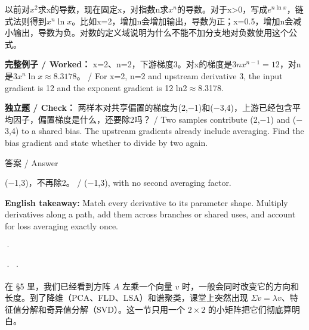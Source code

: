 

以前对\(x^2\)求x的导数，现在固定x，对指数n求\(x^n\)的导数。对于x>0，写成\(e^{n\ln x}\)，链式法则得到\(x^n\ln x\)。比如x=2，增加n会增加输出，导数为正；x=0.5，增加n会减小输出，导数为负。对数的定义域说明为什么不能不加分支地对负数使用这个公式。


\textbf{完整例子 / Worked：} x=2、n=2，下游梯度3。对x的梯度是\(3n x^{n-1}=12\)，对n是\(3x^n\ln x\approx8.3178\)。 / For x=2, n=2 and upstream derivative 3, the input gradient is 12 and the exponent gradient is 12 ln2\ensuremath{\approx}8.3178.


\textbf{独立题 / Check：} 两样本对共享偏置的梯度为(2,\ensuremath{-}1)和(\ensuremath{-}3,4)，上游已经包含平均因子，偏置梯度是什么，还要除2吗？ / Two samples contribute (2,\ensuremath{-}1) and (\ensuremath{-}3,4) to a shared bias. The upstream gradients already include averaging. Find the bias gradient and state whether to divide by two again.



\begin{StudySolution}{答案 / Answer}


(\ensuremath{-}1,3)，不再除2。 / (\ensuremath{-}1,3), with no second averaging factor.


\end{StudySolution}


\textbf{English takeaway:} Match every derivative to its parameter shape. Multiply derivatives along a path, add them across branches or shared uses, and account for loss averaging exactly once.


 · 








 ·  · 


在 §5 里，我们已经看到方阵 \(A\) 左乘一个向量 \(v\) 时，一般会同时改变它的方向和长度。到了降维（PCA、FLD、LSA）和谱聚类，课堂上突然出现 \(\Sigma v = \lambda v\)、特征值分解和奇异值分解（SVD）。这一节只用一个 \(2\times 2\) 的小矩阵把它们彻底算明白。


